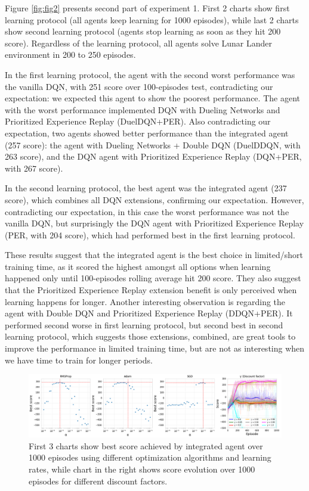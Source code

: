 \documentclass{article}
\begin{document}
    Figure \ref{fig:fig2} presents second part of experiment 1.
    First 2 charts show first learning protocol (all agents keep learning for 1000 episodes), while last 2 charts show second learning protocol (agents stop learning as soon as they hit 200 score).
    Regardless of the learning protocol, all agents solve Lunar Lander environment in 200 to 250 episodes.

    In the first learning protocol, the agent with the second worst performance was the vanilla DQN, with 251 score over 100-episodes test, contradicting our expectation: we expected this agent to show the poorest performance.
    The agent with the worst performance implemented DQN with Dueling Networks and Prioritized Experience Replay (DuelDQN+PER).
    Also contradicting our expectation, two agents showed better performance than the integrated agent (257 score): the agent with Dueling Networks + Double DQN (DuelDDQN, with 263 score), and the DQN agent with Prioritized Experience Replay (DQN+PER, with 267 score).

    In the second learning protocol, the best agent was the integrated agent (237 score), which combines all DQN extensions, confirming our expectation.
    However, contradicting our expectation, in this case the worst performance was not the vanilla DQN, but surprisingly the DQN agent with Prioritized Experience Replay (PER, with 204 score), which had performed best in the first learning protocol.

    These results suggest that the integrated agent is the best choice in limited/short training time, as it scored the highest amongst all options when learning happened only until 100-episodes rolling average hit 200 score.
    They also suggest that the Prioritized Experience Replay extension benefit is only perceived when learning happens for longer.
    Another interesting observation is regarding the agent with Double DQN and Prioritized Experience Replay (DDQN+PER).
    It performed second worse in first learning protocol, but second best in second learning protocol, which suggests those extensions, combined, are great tools to improve the performance in limited training time, but are not as interesting when we have time to train for longer periods.

    \begin{figure}[t]
        \includegraphics[width=\textwidth]{./images/fig3.png}
        \centering
        \caption{First 3 charts show best score achieved by integrated agent over 1000 episodes using different optimization algorithms and learning rates, while chart in the right shows score evolution over 1000 episodes for different discount factors.}
        \label{fig:fig3}
    \end{figure}
\end{document}
